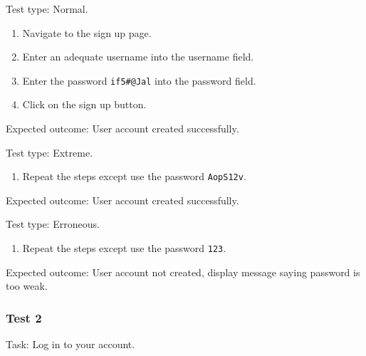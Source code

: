 {\color{gray} \hrulefill}

{\sffamily Test type: Normal.}

\begin{enumerate}
  \item Navigate to the sign up page.
  \item Enter an adequate username into the username field.
  \item Enter the password \texttt{if5\#@Jal} into the password field.
  \item Click on the sign up button.
\end{enumerate}

{\sffamily Expected outcome:} User account created successfully. \\

{\color{gray} \hrulefill}

{\sffamily Test type: Extreme.}\\

\begin{enumerate}
\item Repeat the steps except use the password \texttt{AopS12v}.\\
\end{enumerate}

{\sffamily Expected outcome:} User account created successfully.\\

{\color{gray} \hrulefill}

{\sffamily Test type: Erroneous.} \\

\begin{enumerate}
\item Repeat the steps except use the password \texttt{123}.
\end{enumerate}

{\sffamily Expected outcome:} User account not created, display
message saying password is too weak.\\

{\color{gray} \hrulefill}

\vspace{0.2cm}

\subsubsection{Test 2}

{\sffamily Task:} Log in to your account.\\

{\color{gray} \hrulefill}

